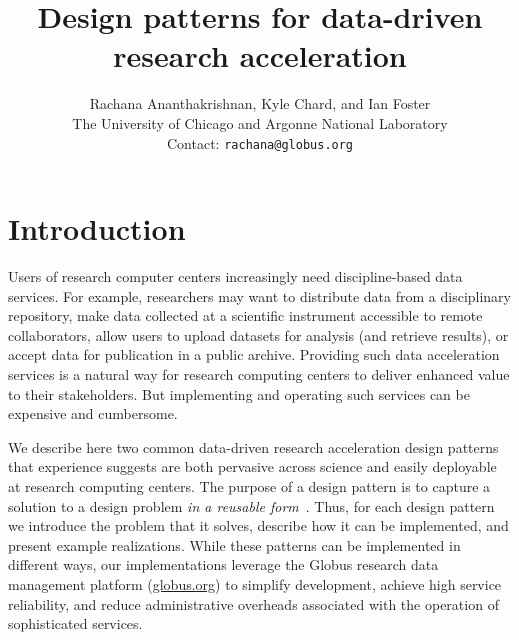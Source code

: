 \documentclass[10pt]{article}
\begin{document}
\date{}

\title{\textbf{Design patterns for data-driven research acceleration}}

\author{Rachana Ananthakrishnan, Kyle Chard, and Ian Foster\\
The University of Chicago and Argonne National Laboratory\\
Contact: \texttt{rachana@globus.org}}

\maketitle



\flushbottom
\maketitle
\thispagestyle{empty}

\section*{Introduction}

Users of research computer centers increasingly need %
discipline-based data services.
For example, researchers may want to distribute data from a disciplinary repository, 
make data collected at a scientific instrument accessible to remote collaborators, 
allow users to upload datasets for analysis (and retrieve results), 
or accept data for publication in a public archive.
Providing such data acceleration services is a natural way for research computing centers to deliver
enhanced value to their stakeholders. 
But implementing and operating such services can be expensive and cumbersome. 

We describe here two common data-driven research acceleration design patterns 
that experience suggests are both pervasive across science and easily deployable at
research computing centers.
The purpose of a design pattern is to capture a solution to a design problem \emph{in a reusable form}~\cite{gamma1995design}.
Thus, for each design pattern we introduce the problem that it solves, describe
how it can be implemented, and present example realizations.
While these patterns can be implemented in different ways, 
our implementations  
leverage the Globus research data management platform (\url{globus.org})
to simplify development, achieve high service reliability, and reduce administrative overheads associated with the operation of sophisticated services. 
 
\end{document}
